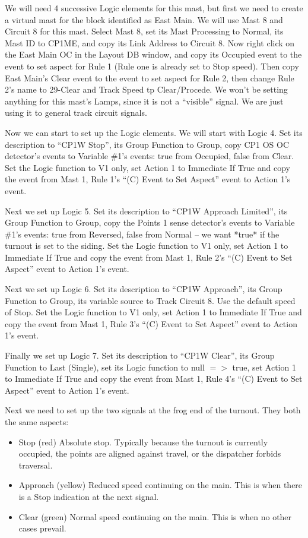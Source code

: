 We will need 4 successive Logic elements for this mast, but first we need to 
create a virtual mast for the block identified as East Main.  We will use Mast 
8 and Circuit 8 for this mast.  Select Mast 8, set its Mast Processing to 
Normal, its Mast ID to CP1ME, and copy its Link Address to Circuit 8.  Now 
right click on the East Main OC in the Layout DB window, and copy its Occupied 
event to the event to set aspect for Rule 1 (Rule one is already set to Stop 
speed).  Then copy East Main's Clear event to the event to set aspect for Rule 
2, then change Rule 2's name to 29-Clear and Track Speed tp Clear/Procede.  We 
won't be setting anything for this mast's Lamps, since it is not a ``visible'' 
signal.  We are just using it to general track circuit signals.

Now we can start to set up the Logic elements. We will start with Logic 4. Set
its description to ``CP1W Stop'', its Group Function to Group, copy CP1 OS OC
detector's events to Variable \#1's events: true from Occupied, false from
Clear. Set the Logic function to V1 only, set Action 1 to Immediate If True
and copy the event from Mast 1, Rule 1's ``(C) Event to Set Aspect'' event to 
Action 1's event.

Next we set up Logic 5. Set its description to ``CP1W Approach Limited'', its 
Group Function to Group, copy the Points 1 sense detector's events to Variable 
\#1's events: true from Reversed, false from Normal -- we want *true* if the 
turnout is set to the siding. Set the Logic function to V1 only, set Action 1 
to Immediate If True  and copy the event from Mast 1, Rule 2's ``(C) Event to 
Set Aspect'' event to Action 1's event.

Next we set up Logic 6. Set its description to ``CP1W Approach'', its Group 
Function to Group, its variable source to Track Circuit 8.  Use the default 
speed of Stop.  Set the Logic function to V1 only, set Action 1 to Immediate 
If True  and copy the event from Mast 1, Rule 3's ``(C) Event to Set Aspect'' 
event to Action 1's event.

Finally we set up Logic 7. Set its description to ``CP1W Clear'', its Group 
Function to Last (Single), set its Logic function to null $=>$ true, set Action 
1 to Immediate If True  and copy the event from Mast 1, Rule 4's ``(C) Event 
to Set Aspect'' event to Action 1's event.

Next we need to set up the two signals at the frog end of the turnout.  They 
both the same aspects:

\begin{itemize}
\item Stop (red) Absolute stop.  Typically because the turnout is currently 
occupied, the points are aligned against travel, or the dispatcher forbids 
traversal.
\item Approach (yellow) Reduced speed continuing on the main.  This is when 
there is a Stop indication at the next signal.
\item  Clear (green) Normal speed continuing on the main.  This is when no 
other cases prevail.
\end{itemize}

